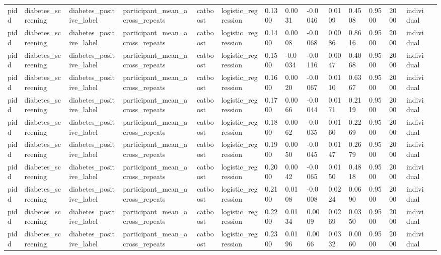 \begin{tabular}{lllllllllllllll}
pidd & diabetes\_screening & diabetes\_positive\_label & participant\_mean\_across\_repeats & catboost & logistic\_regression & 0.1300 & 0.0031 & -0.0046 & 0.0109 & 0.4508 & 0.9500 & 2000 & individual &  \\
pidd & diabetes\_screening & diabetes\_positive\_label & participant\_mean\_across\_repeats & catboost & logistic\_regression & 0.1400 & 0.0008 & -0.0068 & 0.0086 & 0.8616 & 0.9500 & 2000 & individual &  \\
pidd & diabetes\_screening & diabetes\_positive\_label & participant\_mean\_across\_repeats & catboost & logistic\_regression & 0.1500 & -0.0034 & -0.0116 & 0.0047 & 0.4068 & 0.9500 & 2000 & individual &  \\
pidd & diabetes\_screening & diabetes\_positive\_label & participant\_mean\_across\_repeats & catboost & logistic\_regression & 0.1600 & 0.0020 & -0.0067 & 0.0110 & 0.6367 & 0.9500 & 2000 & individual &  \\
pidd & diabetes\_screening & diabetes\_positive\_label & participant\_mean\_across\_repeats & catboost & logistic\_regression & 0.1700 & 0.0066 & -0.0044 & 0.0171 & 0.2119 & 0.9500 & 2000 & individual &  \\
pidd & diabetes\_screening & diabetes\_positive\_label & participant\_mean\_across\_repeats & catboost & logistic\_regression & 0.1800 & 0.0062 & -0.0035 & 0.0160 & 0.2269 & 0.9500 & 2000 & individual &  \\
pidd & diabetes\_screening & diabetes\_positive\_label & participant\_mean\_across\_repeats & catboost & logistic\_regression & 0.1900 & 0.0050 & -0.0045 & 0.0147 & 0.2679 & 0.9500 & 2000 & individual &  \\
pidd & diabetes\_screening & diabetes\_positive\_label & participant\_mean\_across\_repeats & catboost & logistic\_regression & 0.2000 & 0.0042 & -0.0065 & 0.0150 & 0.4818 & 0.9500 & 2000 & individual &  \\
pidd & diabetes\_screening & diabetes\_positive\_label & participant\_mean\_across\_repeats & catboost & logistic\_regression & 0.2100 & 0.0108 & -0.0008 & 0.0224 & 0.0690 & 0.9500 & 2000 & individual &  \\
pidd & diabetes\_screening & diabetes\_positive\_label & participant\_mean\_across\_repeats & catboost & logistic\_regression & 0.2200 & 0.0134 & 0.0009 & 0.0269 & 0.0350 & 0.9500 & 2000 & individual &  \\
pidd & diabetes\_screening & diabetes\_positive\_label & participant\_mean\_across\_repeats & catboost & logistic\_regression & 0.2300 & 0.0196 & 0.0066 & 0.0332 & 0.0060 & 0.9500 & 2000 & individual &  \\

\end{tabular}
